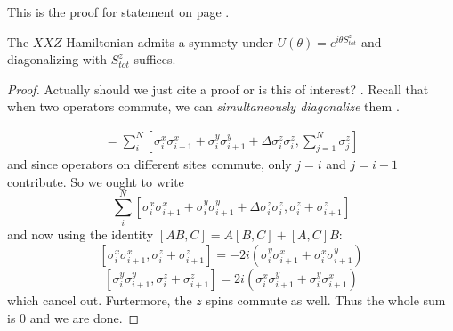 This is the proof for statement  on page \pageref{sym:eq:u1_commutes}.

\begin{lemma}
  The $XXZ$ Hamiltonian admits a symmety under $U(\theta) = e^{i\theta S_{tot}^z }$ and diagonalizing with $S_{tot}^z$ suffices. 
\end{lemma}

\begin{proof}\label{app:proof:u1_commutes}
  Actually should we just cite a proof or is this of interest? \cite[§~4.2]{Hassler2024}.
  Recall that when two operators commute, we can \emph{simultaneously diagonalize} them
  \cite[Theorem~1.3.12]{Horn_Johnson_2012}.

  \begin{align*}
    [H, S^z_{\mathrm{tot}}] = \sum_{i}^{N} [\sigma_i^x \sigma_{i+1}^x + \sigma_i^y \sigma_{i+1}^y + \Delta \sigma_i^z \sigma_i^z, \sum_{j = 1}^{N} \sigma_j^z ] 
  \end{align*}
  and since operators on different sites commute, only $j = i$ and $j = i+1$ contribute.
  So we ought to write
  \[
    \sum_{i}^{N} [\sigma_i^x \sigma_{i+1}^x + \sigma_i^y \sigma_{i+1}^y + \Delta \sigma_i^z \sigma_i^z, \sigma_i^z + \sigma_{i+1}^z  ] 
  \]
  and now using the identity $[AB,C] = A[B,C] + [A,C]B$:
  \[
    [\sigma_i^x \sigma_{i+1}^x, \sigma_i^z + \sigma_{i+1}^z  ] = -2i(\sigma_i^y \sigma_{i+1}^x + \sigma_i^x \sigma_{i+1}^y  ) 
  \]
  \[
    [\sigma_i^y \sigma_{i+1}^y, \sigma_i^z + \sigma_{i+1}^z  ] = 2i(\sigma_i^x \sigma_{i+1}^{y} + \sigma_i^y \sigma_{i+1}^x  )
  \]
  which cancel out. Furtermore, the $z$ spins commute as well. Thus the whole sum is $0$
  and we are done.
\end{proof}

